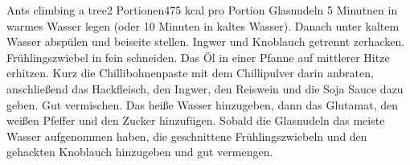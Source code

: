 


\begin{recipe}{Ants climbing a tree}{2 Portionen}{475 kcal pro Portion}
Glasnudeln 5 Minutnen in warmes Wasser legen (oder 10 Minuten in kaltes Wasser).
Danach unter kaltem Wasser absp\"ulen und beiseite stellen.
Ingwer und Knoblauch getrennt zerhacken. 
Fr\"uhlingszwiebel in fein schneiden.
Das \"Ol in einer Pfanne auf mittlerer Hitze erhitzen.
Kurz die Chillibohnenpaste mit dem Chillipulver darin anbraten,
anschlie\ss{}end das Hackfleisch, den Ingwer, den Reiswein und die Soja Sauce dazu geben.
Gut vermischen.
Das hei\ss{}e Wasser hinzugeben, dann das Glutamat, den wei\ss{}en Pfeffer und den Zucker hinzuf\"ugen.
\ing[]{}{}
Sobald die Glasnudeln das meiste Wasser aufgenommen haben, die geschnittene Fr\"uhlingszwiebeln und den gehackten Knoblauch hinzugeben und gut vermengen.
\end{recipe}

